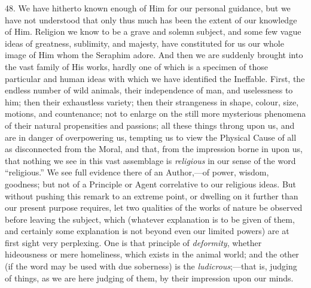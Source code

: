 48.
We have hitherto known enough of Him for our personal guidance, but we
have not understood that only thus much has been the extent of our
knowledge of Him. Religion we know to be a grave and solemn subject,
and some few vague ideas of greatness, sublimity, and majesty, have
constituted for us our whole image of Him whom the Seraphim adore. And
then we are suddenly brought into the vast family of His works, hardly
one of which is a specimen of those particular and human ideas with
which we have identified the Ineffable. First, the endless number of
wild animals, their independence of man, and uselessness to him;
then their exhaustless variety; then their strangeness in shape,
colour, size, motions, and countenance; not to enlarge on the still
more mysterious phenomena of their natural propensities and passions;
all these things throng upon us, and are in danger of overpowering us,
tempting us to view the Physical Cause of all as disconnected from the
Moral, and that, from the impression borne in upon us, that nothing we
see in this vast assemblage is \emph{religious} in our sense of the
word ``religious.'' We see full evidence there of an Author,—of power,
wisdom, goodness; but not of a Principle or Agent correlative to our
religious ideas. But without pushing this remark to an extreme point,
or dwelling on it further than our present purpose requires, let two
qualities of the works of nature be observed before leaving the
subject, which (whatever explanation is to be given of them, and
certainly some explanation is not beyond even our limited powers) are
at first sight very perplexing. One is that principle of \emph{deformity},
whether hideousness or mere homeliness, which exists in the animal
world; and the other (if the word may be used with due soberness) is
the \emph{ludicrous};—that is, judging of things, as we are here
judging of them, by their impression upon our minds.

